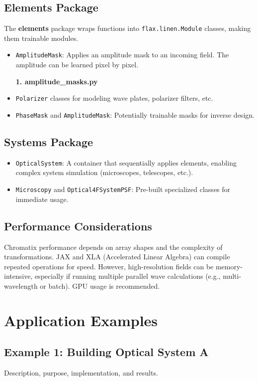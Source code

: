 \documentclass[a4paper,12pt]{report}
\begin{document}
\section{Elements Package}
The \textbf{elements} package wraps functions into \texttt{flax.linen.Module} classes, making them trainable modules.
\begin{itemize}

    \item \texttt{AmplitudeMask}: Applies an amplitude mask to an incoming field. The amplitude can be learned pixel by pixel.
    
    \vspace{1em}
    {\large \textbf{1. amplitude\_masks.py}}
    \item \texttt{Polarizer} classes for modeling wave plates, polarizer filters, etc.
    \item \texttt{PhaseMask} and \texttt{AmplitudeMask}: Potentially trainable masks for inverse design.
\end{itemize}

\section{Systems Package}
\begin{itemize}
    \item \texttt{OpticalSystem}: A container that sequentially applies elements, enabling complex system simulation (microscopes, telescopes, etc.).
    \item \texttt{Microscopy} and \texttt{Optical4FSystemPSF}: Pre-built specialized classes for immediate usage.
\end{itemize}

\section{Performance Considerations}
Chromatix performance depends on array shapes and the complexity of transformations. JAX and XLA (Accelerated Linear Algebra) can compile repeated operations for speed. However, high-resolution fields can be memory-intensive, especially if running multiple parallel wave calculations (e.g., multi-wavelength or batch). GPU usage is recommended.

\chapter{Application Examples}
\section{Example 1: Building Optical System A}
Description, purpose, implementation, and results.
\end{document}
